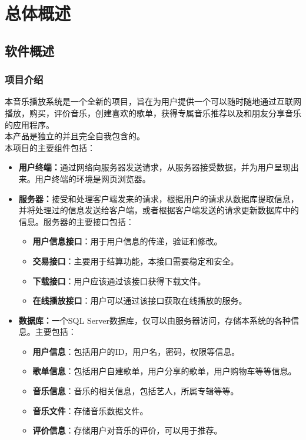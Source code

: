 \chapter{总体概述}


\section{软件概述}
\subsection{项目介绍}


本音乐播放系统是一个全新的项目，旨在为用户提供一个可以随时随地通过互联网播放，购买，评价音乐，创建喜欢的歌单，获得专属音乐推荐以及和朋友分享音乐的应用程序。\\


本产品是独立的并且完全自我包含的。\\
本项目的主要组件包括：
\begin{itemize}
\item \textbf{用户终端：}通过网络向服务器发送请求，从服务器接受数据，并为用户呈现出来。用户终端的环境是网页浏览器。
\item \textbf{服务器：}接受和处理客户端发来的请求，根据用户的请求从数据库提取信息，并将处理过的信息发送给客户端，或者根据客户端发送的请求更新数据库中的信息。服务器的主要接口包括：
\begin{itemize}
\item \textbf{用户信息接口}：用于用户信息的传递，验证和修改。
\item \textbf{交易接口}：主要用于结算功能，本接口需要稳定和安全。
\item \textbf{下载接口}：用户应该通过该接口获得下载文件。
\item \textbf{在线播放接口}：用户可以通过该接口获取在线播放的服务。
\end{itemize}
\item \textbf{数据库：}一个SQL Server数据库，仅可以由服务器访问，存储本系统的各种信息。主要包括：
\begin{itemize}
\item \textbf{用户信息}：包括用户的ID，用户名，密码，权限等信息。
\item \textbf{歌单信息}：包括用户自建歌单，用户分享的歌单，用户购物车等等信息。
\item \textbf{音乐信息}：音乐的相关信息，包括艺人，所属专辑等等。
\item \textbf{音乐文件}：存储音乐数据文件。
\item \textbf{评价信息}：存储用户对音乐的评价，可以用于推荐。
\end{itemize}
\end{itemize}

